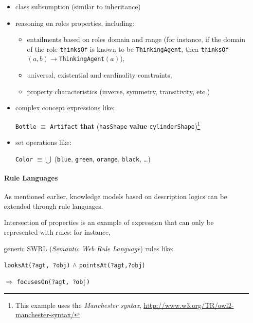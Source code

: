 \documentclass[a4paper, twocolumn]{article}
\newcommand{\concept}[1]{{\footnotesize \texttt{#1}}}
\begin{document}
\begin{itemize}
    \item class subsumption (similar to inheritance)

    \item reasoning on roles properties, including:
        \begin{itemize}
        \item entailments based on roles domain and range (for instance, if the
        domain of the role \concept{thinksOf} is known to be
        \concept{ThinkingAgent}, then \concept{thinksOf}$(a, b) \to
        $\concept{ThinkingAgent}$(a)$),

        \item universal, existential and cardinality constraints,

        \item property characteristics (inverse, symmetry, transitivity, etc.)

        \end{itemize}

    \item complex concept expressions like: \par \footnotesize \concept{Bottle}
    $\equiv$ \concept{Artifact} {\bf that} (\concept{hasShape} {\bf value}
    \concept{cylinderShape})\footnote{This example uses the \emph{Manchester
    syntax}, \url{http://www.w3.org/TR/owl2-manchester-syntax/}} \normalsize

    \item set operations like: \par \footnotesize \concept{Color} $\equiv \bigcup$ (\concept{blue}, \concept{green}, \concept{orange},
    \concept{black}, \ldots) \normalsize

\end{itemize}

\paragraph{Rule Languages}

As mentioned earlier, knowledge models based on description logics can be extended through rule languages.

Intersection of properties is an example of expression that can only be represented with rules: for instance, 

generic SWRL ({\em Semantic Web Rule Language}) rules like: \par
        \footnotesize \concept{looksAt(?agt, ?obj)} $\land$
        \concept{pointsAt(?agt,?obj)} \par $\Rightarrow$ \concept{focusesOn(?agt, ?obj)}
        \normalsize 
\end{document}
